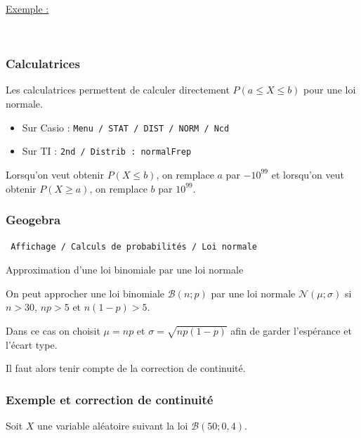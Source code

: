 \vfill

\underline{Exemple :}\sautm


\vfill ~




\bigskip

\subsubsection{Calculatrices}

Les calculatrices permettent de calculer directement $P(a\le X\le b)$ pour une loi normale.

\begin{itemize}
	\item[$\bullet$] 	Sur Casio : \verb+Menu / STAT / DIST / NORM / Ncd+

	\item[$\bullet$] 	Sur TI : \verb+2nd / Distrib : normalFrep+

\end{itemize}

Lorsqu'on veut obtenir $P(X\le b)$, on remplace $a$ par $-10^{99}$ et lorsqu'on veut obtenir $P(X\geq a)$, on remplace $b$ par $10^{99}$.

\subsubsection{Geogebra}

\verb+ Affichage / Calculs de probabilités / Loi normale+

\bigskip

Approximation d'une loi binomiale par une loi normale

On peut approcher une loi binomiale $\mathcal{B}(n;p)$ par une loi normale $\mathcal{N}(\mu;\sigma)$ si $n>30$, $np>5$ et $n(1-p)>5$.

Dans ce cas on choisit $\mu=np$ et $\sigma=\sqrt{np(1-p)}$ afin de garder l'espérance et l'écart type.

Il faut alors tenir compte de la correction de continuité.



\newpage

\subsubsection{Exemple et correction de continuité}

Soit $X$ une variable aléatoire suivant la loi  $\mathcal{B}(50;0,4)$.

